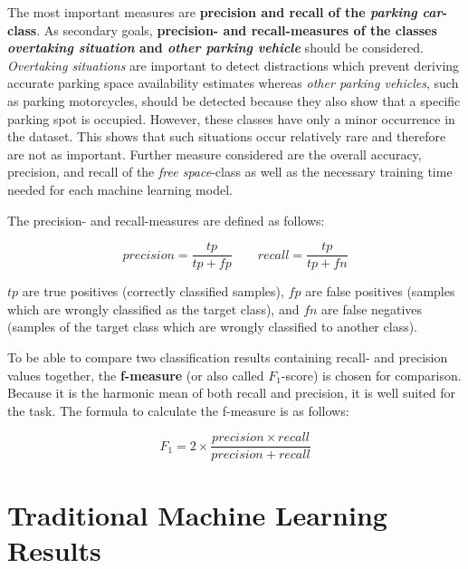 The most important measures are \textbf{precision and recall of the \emph{parking car}-class}. As secondary goals, \textbf{precision- and recall-measures of the classes \emph{overtaking situation} and \emph{other parking vehicle}} should be considered. \emph{Overtaking situations} are important to detect distractions which prevent deriving accurate parking space availability estimates whereas \emph{other parking vehicles}, such as parking motorcycles, should be detected because they also show that a specific parking spot is occupied. However, these classes have only a minor occurrence in the dataset. This shows that such situations occur relatively rare and therefore are not as important. Further measure considered are the overall accuracy, precision, and recall of the \emph{free space}-class as well as the necessary training time needed for each machine learning model.

The precision- and recall-measures are defined as follows:

\[ precision = \frac{tp}{tp + fp} \qquad recall = \frac{tp}{tp + fn} \]



$tp$ are true positives (correctly classified samples), $fp$ are false positives (samples which are wrongly classified as the target class), and $fn$ are false negatives (samples of the target class which are wrongly classified to another class).

To be able to compare two classification results containing recall- and precision values together, the \textbf{f-measure} (or also called $F_1$-score) is chosen for comparison. Because it is the harmonic mean of both recall and precision, it is well suited for the task. The formula to calculate the f-measure is as follows: 

\[ F_1 = 2 \times \frac{precision \times recall}{precision + recall} \]






\section{Traditional Machine Learning Results}
\label{sec:machine_learning_results}


